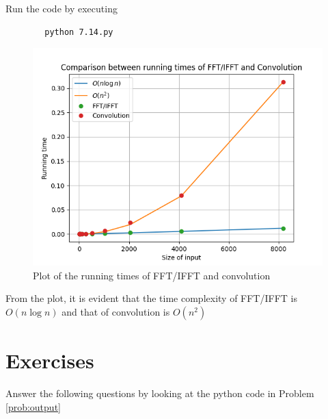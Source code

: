 \documentclass[journal,12pt,twocolumn]{IEEEtran}
\numberwithin{equation}{section}
\renewcommand\thesection{\arabic{section}}
\begin{document}
\begin{enumerate}[label=\thesection.\arabic*]
	Run the code by executing
	\begin{lstlisting}
		python 7.14.py
	\end{lstlisting}

	\begin{figure}[!ht]
		\centering
		\includegraphics[width=\columnwidth]{./figs/7.14.png}
		\caption{Plot of the running times of FFT/IFFT and convolution}
		\label{fig-7.14}	
	\end{figure}
	
	From the plot, it is evident that the time complexity of FFT/IFFT is $O(n \log n)$ and that of convolution is $O(n^2)$
	
	
	\end{enumerate}
	
	\section{Exercises}
	Answer the following questions by looking at the python code in Problem \ref{prob:output}
	
\end{document}
